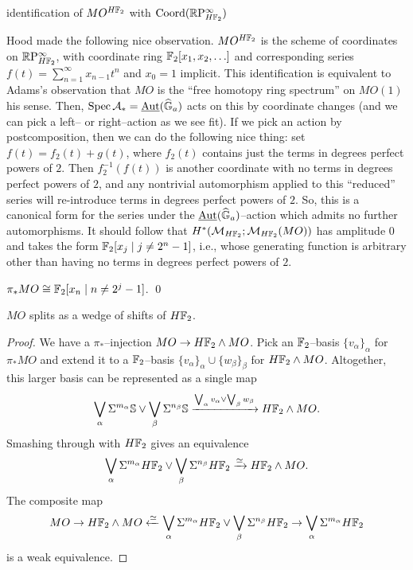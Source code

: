 identification of $MO^{H\mathbb F_2}$ with $\operatorname{Coord}(\mathbb R\mathrm P^\infty_{H\mathbb F_2})$

Hood made the following nice observation. $MO^{H\mathbb F_2}$ is the scheme of coordinates on $\mathbb R\mathrm P^\infty_{H\mathbb F_2}$, with coordinate ring $\mathbb F_2[x_1, x_2, \ldots]$ and corresponding series $f(t) = \sum_{n=1}^\infty x_{n-1} t^n$ and $x_0 = 1$ implicit. This identification is equivalent to Adams's observation that $MO$ is the ``free homotopy ring spectrum'' on $MO(1)$ his sense. Then, $\operatorname{Spec} \mathcal{A}_* = \underline{\operatorname{Aut}}(\widehat{\mathbb G}_a)$ acts on this by coordinate changes (and we can pick a left-- or right--action as we see fit). If we pick an action by postcomposition, then we can do the following nice thing: set $f(t) = f_2(t) + g(t)$, where $f_2(t)$ contains just the terms in degrees perfect powers of $2$. Then $f_2^{-1}(f(t))$ is another coordinate with no terms in degrees perfect powers of $2$, and any nontrivial automorphism applied to this ``reduced'' series will re-introduce terms in degrees perfect powers of $2$.  So, this is a canonical form for the series under the $\underline{\operatorname{Aut}}(\widehat{\mathbb G}_a)$--action which admits no further automorphisms. It should follow that $H^*(\mathcal{M}_{H\mathbb F_2}; \mathcal{M}_{H\mathbb F_2}(MO))$ has amplitude $0$ and takes the form $\mathbb F_2[x_j \mid j \ne 2^n - 1]$, i.e., whose generating function is arbitrary other than having no terms in degrees perfect powers of $2$.

\begin{corollary}
$\pi_* MO \cong \mathbb F_2[x_n \mid n \ne 2^j - 1]$. \qed {}
\end{corollary}

\begin{corollary}
$MO$ splits as a wedge of shifts of $H\mathbb F_2$.
\end{corollary}
\begin{proof}
We have a $\pi_*$--injection $MO \to H\mathbb F_2 \wedge MO$.  Pick an $\mathbb F_2$--basis $\{v_\alpha\}_\alpha$ for $\pi_* MO$ and extend it to a $\mathbb F_2$--basis $\{v_\alpha\}_\alpha \cup \{w_\beta\}_\beta$ for $H\mathbb F_2 \wedge MO$.  Altogether, this larger basis can be represented as a single map \[\bigvee_\alpha \Sigma^{m_\alpha} \mathbb S \vee \bigvee_\beta \Sigma^{n_\beta} \mathbb S \xrightarrow{\bigvee_\alpha v_\alpha \vee \bigvee_\beta w_\beta} H\mathbb F_2 \wedge MO.\]  Smashing through with $H\mathbb F_2$ gives an equivalence \[\bigvee_\alpha \Sigma^{m_\alpha} H\mathbb F_2 \vee \bigvee_\beta \Sigma^{n_\beta} H\mathbb F_2 \xrightarrow\simeq H\mathbb F_2 \wedge MO.\]  The composite map \[MO \to H\mathbb F_2 \wedge MO \xleftarrow\simeq \bigvee_\alpha \Sigma^{m_\alpha} H\mathbb F_2 \vee \bigvee_\beta \Sigma^{n_\beta} H\mathbb F_2 \to \bigvee_\alpha \Sigma^{m_\alpha} H\mathbb F_2\] is a weak equivalence.
\end{proof}




